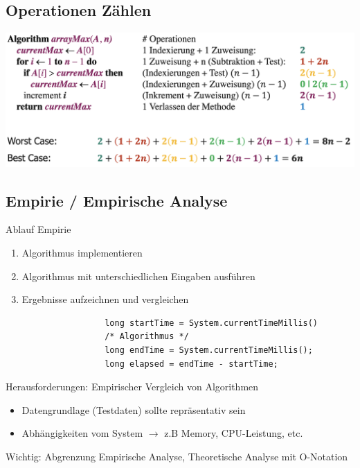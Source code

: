 \documentclass[a4paper, landscape, 8pt]{scrartcl}
\begin{document}
\begin{multicols*}{4}
            \subsection{Operationen Zählen}
                \includegraphics[scale=0.17]{graphic/04_primitive_operationen_zaehlen}

            \subsection{Empirie / Empirische Analyse}
                \textcolor{subsectioncolor}{Ablauf Empirie}
                \begin{enumerate}
                    \item Algorithmus implementieren
                    \item Algorithmus mit unterschiedlichen Eingaben ausführen
                    \item Ergebnisse aufzeichnen und vergleichen
                \end{enumerate}
                \begin{lstlisting}
                    long startTime = System.currentTimeMillis()
                    /* Algorithmus */
                    long endTime = System.currentTimeMillis();
                    long elapsed = endTime - startTime;
                \end{lstlisting}
                \textcolor{subsectioncolor}{Herausforderungen: Empirischer Vergleich von Algorithmen}
                \begin{itemize}
                    \item Datengrundlage (Testdaten) sollte repräsentativ sein
                    \item Abhängigkeiten vom System $\to$ z.B Memory, CPU-Leistung, etc.
                \end{itemize}

                Wichtig: Abgrenzung Empirische Analyse, Theoretische Analyse mit O-Notation
        

\end{multicols*}
\end{document}
